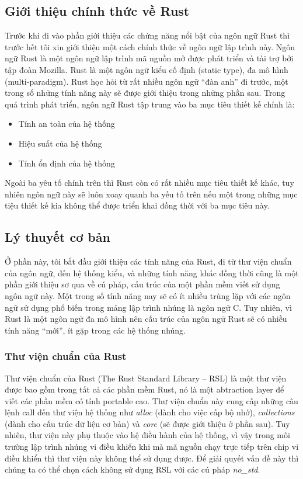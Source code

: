 \subsection{Giới thiệu chính thức về Rust}
Trước khi đi vào phần giới thiệu các chứng năng nổi bật của ngôn ngữ Rust thì trước hết tôi xin giới thiệu một cách chính thức về ngôn ngữ lập trình này.
Ngôn ngữ Rust là một ngôn ngữ lập trình mã nguồn mở được phát triển và tài trợ bởi tập đoàn Mozilla.
Rust là một ngôn ngữ kiểu cố định (static type), đa mô hình (multi-paradigm).
Rust học hỏi từ rất nhiều ngôn ngữ ``đàn anh'' đi trước, một trong số những tính năng này sẽ được giới thiệu trong những phần sau.
Trong quá trình phát triển, ngôn ngữ Rust tập trung vào ba mục tiêu thiết kế chính là:
\begin{itemize}
\item Tính an toàn của hệ thống
\item Hiệu suất của hệ thống
\item Tính ổn định của hệ thống
\end{itemize}
Ngoài ba yêu tố chính trên thì Rust còn có rất nhiều mục tiêu thiết kế khác, tuy nhiên ngôn ngữ này sẽ luôn xoay quanh ba yếu tố trên nếu một trong những mục tiệu thiết kế kia không thể được triển khai đồng thời với ba mục tiêu này.

\subsection{Lý thuyết cơ bản}
Ở phần này, tôi bắt đầu giới thiệu các tính năng của Rust, đi từ thư viện chuẩn của ngôn ngữ, đến hệ thống kiểu, và những tính năng khác đồng thời cũng là một phần giới thiệu sơ qua về cú pháp, cấu trúc của một phần mềm viết sử dụng ngôn ngữ này.
Một trong số tính năng nay sẽ có ít nhiều trùng lặp với các ngôn ngữ sử dụng phổ biến trong mảng lập trình nhúng là ngôn ngữ C.
Tuy nhiên, vì Rust là một ngôn ngữ đa mô hình nên cấu trúc của ngôn ngữ Rust sẽ có nhiều tính năng ``mới'', ít gặp trong các hệ thống nhúng.
\subsubsection{Thư viện chuẩn của Rust}
Thư viện chuẩn của Rust (The Rust Standard Library -- RSL) là một thư viện được bao gồm trong tất cả các phần mềm Rust, nó là một abtraction layer để viết các phần mềm có tính portable cao.
Thư viện chuẩn này cung cấp những câu lệnh call đến thư viện hệ thống như \emph{alloc} (dành cho việc cấp bộ nhớ), \emph{collections} (dành cho cấu trúc dữ liệu cơ bản) và \emph{core} (sẽ được giới thiệu ở phần sau).
Tuy nhiên, thư viện này phụ thuộc vào hệ điều hành của hệ thống, vì vậy trong môi trường lập trình nhúng vi điều khiển khi mà mã nguồn chạy trực tiếp trên chip vi điều khiển thì thư viện này không thể sử dụng được.
Để giải quyết vấn đề này thì chúng ta có thể chọn cách không sử dụng RSL với các cú pháp \emph{no\_std}.

